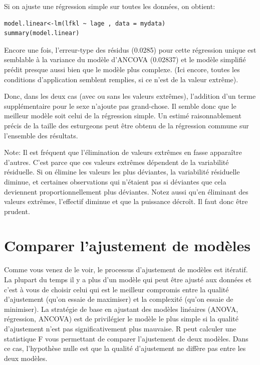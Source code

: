 \documentclass[12pt,]{book}
\begin{document}
Si on ajuste une régression simple sur toutes les données, on obtient:

\begin{verbatim}
model.linear<-lm(lfkl ~ lage , data = mydata)
summary(model.linear)
\end{verbatim}

Encore une fois, l'erreur-type des résidus (0.0285) pour cette
régression unique est semblable à la variance du modèle d'ANCOVA
(0.02837) et le modèle simplifié prédit presque aussi bien que le
modèle plus complexe. (Ici encore, toutes les conditions d'application
semblent remplies, si ce n'est de la valeur extrême).

Donc, dans les deux cas (avec ou sans les valeurs extrêmes), l'addition
d'un terme supplémentaire pour le sexe n'ajoute pas grand-chose. Il
semble donc que le meilleur modèle soit celui de la régression simple.
Un estimé raisonnablement précis de la taille des esturgeons peut être
obtenu de la régression commune sur l'ensemble des résultats.

Note: Il est fréquent que l'élimination de valeurs extrêmes en fasse
apparaître d'autres. C'est parce que ces valeurs extrêmes dépendent de
la variabilité résiduelle. Si on élimine les valeurs les plus déviantes, la
variabilité résiduelle diminue, et certaines observations qui n'étaient
pas si déviantes que cela deviennent proportionnellement plus
déviantes. Notez aussi qu'en éliminant des valeurs extrêmes, l'effectif
diminue et que la puissance décroît. Il faut donc être prudent.

\hypertarget{comparer-lajustement-de-moduxe8les}{%
\section{Comparer l'ajustement de modèles}\label{comparer-lajustement-de-moduxe8les}}

Comme vous venez de le voir, le processus d'ajustement de modèles
est itératif. La plupart du temps il y a plus d'un modèle qui peut être
ajusté aux données et c'est à vous de choisir celui qui est le meilleur
compromis entre la qualité d'ajustement (qu'on essaie de maximiser)
et la complexité (qu'on essaie de minimiser). La stratégie de base en
ajustant des modèles linéaires (ANOVA, régression, ANCOVA) est
de privilégier le modèle le plus simple si la qualité d'ajustement n'est
pas significativement plus mauvaise. R peut calculer une statistique F
vous permettant de comparer l'ajustement de deux modèles. Dans ce
cas, l'hypothèse nulle est que la qualité d'ajustement ne diffère pas
entre les deux modèles.
\end{document}
